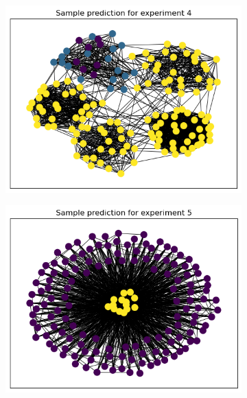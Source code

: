\documentclass[switch, 12pt]{article}
\begin{document}
\begin{figure}[h]
    \hfill
    \begin{subfigure}{0.28\linewidth}
        \centering
        \includegraphics[width=\linewidth]{figures/exp4_pred.png}
    \end{subfigure}
    \hfill
    \begin{subfigure}{0.28\linewidth}
        \centering
        \includegraphics[width=\linewidth]{figures/exp5_pred.png}
    \end{subfigure}
    \hfill
    \begin{subfigure}{0.28\linewidth}
        \centering

\end{subfigure}
\end{figure}
\end{document}
